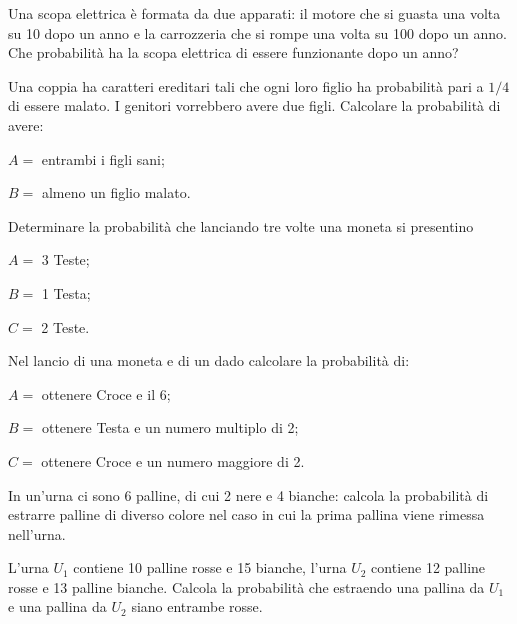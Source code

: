 \begin{esercizio}[\Ast]
 \label{ese:9.54}
Una scopa elettrica è formata da due apparati: il motore che si guasta una volta su 10 dopo un anno e la carrozzeria che si rompe una volta su 100 dopo un anno. Che probabilità ha la scopa elettrica di essere funzionante dopo un anno?
\end{esercizio}

\begin{esercizio}[\Ast]
 \label{ese:9.55}
Una coppia ha caratteri ereditari tali che ogni loro figlio ha probabilità pari a $1/4$ di essere malato. I genitori vorrebbero avere due figli. Calcolare la probabilità di avere:
\begin{itemize*}
\item $ A= $ entrambi i figli sani;
\item $ B= $ almeno un figlio malato.
\end{itemize*}
\end{esercizio}

\begin{esercizio}[\Ast]
 \label{ese:9.56}
Determinare la probabilità che lanciando tre volte una moneta si presentino
\begin{itemize*}
\item $ A= $ 3 Teste;
\item $ B= $ 1 Testa;
\item $ C= $ 2 Teste.
\end{itemize*}
\end{esercizio}

\begin{esercizio}[\Ast]
 \label{ese:9.57}
Nel lancio di una moneta e di un dado calcolare la probabilità di:
\begin{itemize*}
\item $ A= $ ottenere Croce e il 6;
\item $ B= $ ottenere Testa e un numero multiplo di 2;
\item $ C= $ ottenere Croce e un numero maggiore di 2.
\end{itemize*}
\end{esercizio}

\begin{esercizio}[\Ast]
 \label{ese:9.58}
In un'urna ci sono 6 palline, di cui 2 nere e 4 bianche: calcola la probabilità di estrarre palline di diverso colore nel caso in cui la prima pallina viene rimessa nell'urna.
\end{esercizio}

\begin{esercizio}
 \label{ese:9.59}
L'urna $ U_1 $ contiene 10 palline rosse e 15 bianche, l'urna $ U_2 $ contiene 12 palline rosse e 13 palline bianche. Calcola la probabilità che estraendo una pallina da $ U_1 $ e una pallina da $ U_2 $ siano entrambe rosse.
\end{esercizio}

